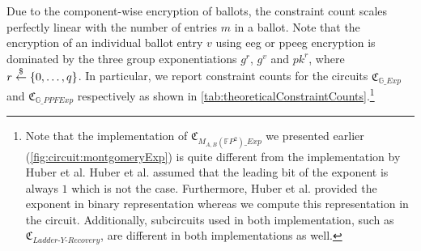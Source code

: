 % 

Due to the component-wise encryption of ballots, the constraint count scales perfectly linear with the number of entries $m$ in a ballot.
Note that the encryption of an individual ballot entry $v$ using \gls{eeg} or \gls{ppeeg} encryption is dominated by the three group exponentiations $g^r$, $g^v$ and $pk^r$, where $r\overset{\$}{\gets} \{0,\dots, q\}$.
In particular, we report constraint counts for the circuits $\mathfrak{C}_{\mathbb{G}\_Exp}$ and $\mathfrak{C}_{\mathbb{G}\_PPFExp}$ respectively as shown in \cref{tab:theoreticalConstraintCounts}.\footnote{
    \label{footnote:libsnarkMontgomeryLadderWrong}
    Note that the implementation of $\mathfrak{C}_{M_{A,B}(\mathbb{F}P^2)\_Exp}$ we presented earlier (\cref{fig:circuit:montgomeryExp}) is quite different from the implementation by Huber et al.
    Huber et al. assumed that the leading bit of the exponent is always $1$ which is not the case.
    Furthermore, Huber et al. provided the exponent in binary representation whereas we compute this representation in the circuit.
    Additionally, subcircuits used in both implementation, such as $\mathfrak{C}_{Ladder\text{-}Y\text{-}Recovery}$, are different in both implementations as well.
}

